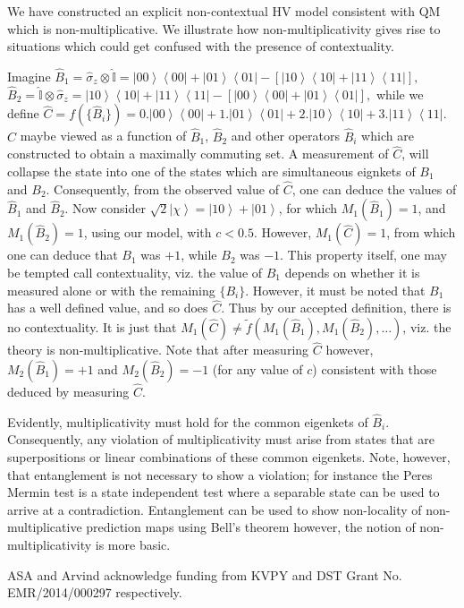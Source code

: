 \documentclass[british,aps,prl,superscriptaddress,nofootinbib,times,reprint]{revtex4-1}
\theoremstyle{plain}
\theoremstyle{plain}
\theoremstyle{definition}
\theoremstyle{remark}
\theoremstyle{remark}
\theoremstyle{remark}
\theoremstyle{plain}
\theoremstyle{plain}
\theoremstyle{plain}
\theoremstyle{definition}
\theoremstyle{definition}
\begin{document}
We have  constructed an explicit non-contextual HV
model consistent with QM which is
non-multiplicative. We illustrate how
non-multiplicativity gives rise to situations which
could get confused with the presence of contextuality.

Imagine
$
\hat{B}_{1}=\hat{\sigma}_{z}\otimes\hat{\mathbb{I}}=
\left|00\right\rangle
\left\langle 00\right|+\left|01\right\rangle
\left\langle 01\right|-\left[\left|10\right\rangle
\left\langle 10\right|+\left|11\right\rangle
\left\langle 11\right|\right],
$ 
$
\hat{B}_{2}=\hat{\mathbb{I}}\otimes\hat{\sigma}_{z}=
\left|10\right\rangle
\left\langle 10\right|+\left|11\right\rangle
\left\langle 11\right|-\left[\left|00\right\rangle
\left\langle 00\right|+\left|01\right\rangle
\left\langle 01\right|\right],
$ 
while we define 
$
\hat{C}=f(\{\hat{B}_{i}\})
=0.\left|00\right\rangle \left\langle
00\right|+1.\left|01\right\rangle \left\langle
01\right|+2.\left|10\right\rangle \left\langle
10\right|+3.\left|11\right\rangle \left\langle
11\right|. 
$
$\hat{C}$ maybe viewed as a function of
$\hat{B}_{1}$, $\hat{B}_{2}$ and other operators
$\hat{B}_{i}$ which are constructed to obtain a
maximally commuting set. A measurement of
$\hat{C}$, will collapse the state into one of the
states which are simultaneous eignkets of $B_{1}$
and $B_{2}$. Consequently, from the observed value
of $\hat{C}$, one can deduce the values of
$\hat{B}_{1}$ and $\hat{B}_{2}$. Now consider
$\sqrt{2}\left|\chi\right\rangle
=\left|10\right\rangle +\left|01\right\rangle $,
for which $M_{1}(\hat{B}_{1})=1$, and
$M_{1}(\hat{B}_{2})=1$, using our model,
with $c<0.5$. However, $M_{1}(\hat{C})=1$, from
which one can deduce that $B_{1}$ was $+1$, while
$B_{2}$ was $-1$.  This property itself, one may
be tempted call contextuality, viz.  the value of
$B_{1}$ depends on whether it is measured alone or
with the remaining $\{B_{i}\}$. However, it must
be noted that $B_{1}$ has a well defined value,
and so does $\hat{C}$. Thus by our accepted
definition, there is no contextuality. It is just
that $M_{1}(\hat{C})\neq \tilde
f(M_{1}(\hat{B}_{1}),M_{1}(\hat{B}_{2}),\dots)$,
viz. the theory is non-multiplicative. Note that
after measuring $\hat{C}$ however,
$M_{2}(\hat{B}_{1})=+1$ and
$M_{2}(\hat{B}_{2})=-1$ (for any value of $c$)
consistent with those deduced by measuring
$\hat{C}$.


Evidently, multiplicativity must hold for the
common eigenkets of $\hat{B}_{i}$.  Consequently,
any violation of multiplicativity must arise from
states that are superpositions or linear
combinations of these common eigenkets.  Note,
however, that entanglement is not necessary to
show a violation; for instance the Peres Mermin
test is a state independent test where a separable
state can be used to arrive at a contradiction.
Entanglement can be used to show non-locality of
non-multiplicative prediction maps using Bell's
theorem however, the notion of non-multiplicativity
is more basic.  \begin{acknowledgments} 
ASA and Arvind acknowledge funding from KVPY and DST Grant No. EMR/2014/000297 respectively.
\end{acknowledgments}
%
 
\end{document}
